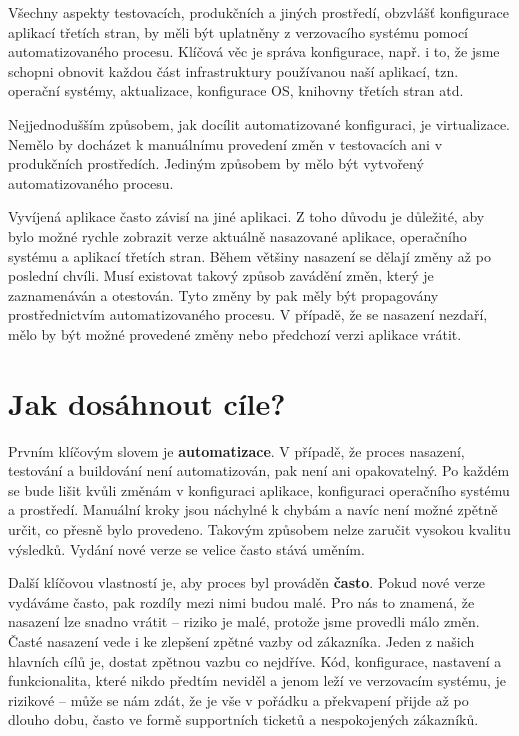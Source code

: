 Všechny aspekty testovacích, produkčních a jiných prostředí, obzvlášť konfigurace aplikací třetích stran, by měli být uplatněny z verzovacího systému pomocí automatizovaného procesu. Klíčová věc je správa konfigurace, např. i to, že jsme schopni obnovit každou část infrastruktury používanou naší aplikací, tzn. operační systémy, aktualizace, konfigurace OS, knihovny třetích stran atd. 

Nejjednodušším způsobem, jak docílit automatizované konfiguraci, je virtualizace. Nemělo by docházet k manuálnímu provedení změn v testovacích ani v produkčních prostředích. Jediným způsobem by mělo být vytvořený automatizovaného procesu.

Vyvíjená aplikace často závisí na jiné aplikaci. Z toho důvodu je důležité, aby bylo možné rychle zobrazit verze aktuálně nasazované aplikace, operačního systému a aplikací třetích stran. Během většiny nasazení se dělají změny až po poslední chvíli. Musí existovat takový způsob zavádění změn, který je zaznamenáván a otestován. Tyto změny by pak měly být propagovány prostřednictvím automatizovaného procesu. V případě, že se nasazení nezdaří, mělo by být možné provedené změny nebo předchozí verzi aplikace vrátit.

\section{Jak dosáhnout cíle?}
Prvním klíčovým slovem je \textbf{automatizace}. V případě, že proces nasazení, testování a buildování není automatizován, pak není ani opakovatelný. Po každém se bude lišit kvůli změnám v konfiguraci aplikace, konfiguraci operačního systému a prostředí. 
Manuální kroky jsou náchylné k chybám a navíc není možné zpětně určit, co přesně bylo provedeno. Takovým způsobem nelze zaručit vysokou kvalitu výsledků. Vydání nové verze se velice často stává uměním. 

Další klíčovou vlastností je, aby proces byl prováděn \textbf{často}. Pokud nové verze vydáváme často, pak rozdíly mezi nimi budou malé. Pro nás to znamená, že nasazení lze snadno vrátit -- riziko je malé, protože jsme provedli málo změn. Časté nasazení vede i ke zlepšení zpětné vazby od zákazníka. Jeden z našich hlavních cílů je, dostat zpětnou vazbu co nejdříve. Kód, konfigurace, nastavení a funkcionalita, které nikdo předtím neviděl a jenom leží ve verzovacím systému, je rizikové -- může se nám zdát, že je vše v pořádku a překvapení přijde až po dlouho dobu, často ve formě supportních ticketů a nespokojených zákazníků.

